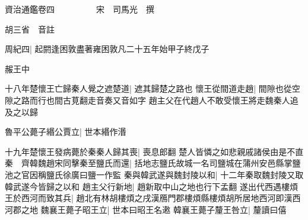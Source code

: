 






























































資治通鑑卷四　　　　　宋　司馬光　撰

胡三省　音註

周紀四|{
	起閼逢困敦盡著雍困敦凡二十五年始甲子終戊子}


赧王中

十八年楚懷王亡歸秦人覺之遮楚道|{
	遮其歸楚之路也}
懷王從間道走趙|{
	間隙也從空隙之路而行也間古莧翻走音奏又音如字}
趙主父在代趙人不敢受懷王將走魏秦人追及之以歸

魯平公薨子緡公賈立|{
	世本緡作湣}


十九年楚懷王發病薨於秦秦人歸其喪|{
	喪息郎翻}
楚人皆憐之如悲親戚諸侯由是不直秦　齊韓魏趙宋同擊秦至鹽氏而還|{
	括地志鹽氏故城一名司鹽城在蒲州安邑縣掌鹽池之官因稱鹽氏徐廣曰鹽一作監}
秦與韓武遂與魏封陵以和|{
	十二年秦取魏封陵又取韓武遂今皆歸之以和}
趙主父行新地|{
	趙新取中山之地也行下孟翻}
遂出代西遇樓煩王於西河而致其兵|{
	趙北有林胡樓煩之戌漢鴈門郡樓煩縣樓煩胡所居地西河即漢西河郡之地}
魏襄王薨子昭王立|{
	世本曰昭王名遫}
韓襄王薨子釐王咎立|{
	釐讀曰僖}


